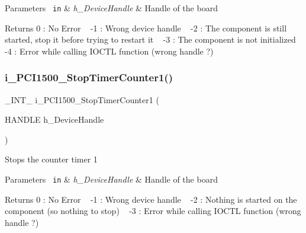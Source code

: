 \begin{DoxyParams}[1]{Parameters}
\mbox{\texttt{ in}}  & {\em h\+\_\+\+Device\+Handle} & Handle of the board\\
\hline
\end{DoxyParams}
\begin{DoxyReturn}{Returns}
0 \+: No Error ~\newline
 -\/1 \+: Wrong device handle ~\newline
 -\/2 \+: The component is still started, stop it before trying to restart it ~\newline
 -\/3 \+: The component is not initialized ~\newline
 -\/4 \+: Error while calling I\+O\+C\+TL function (wrong handle ?) ~\newline

\end{DoxyReturn}
\mbox{\label{group___timer1_ga4e0110031bca63247ff23e9a2419f373}} 
\subsubsection{\texorpdfstring{i\_PCI1500\_StopTimerCounter1()}{i\_PCI1500\_StopTimerCounter1()}}
{\footnotesize\ttfamily \+\_\+\+I\+N\+T\+\_\+ i\+\_\+\+P\+C\+I1500\+\_\+\+Stop\+Timer\+Counter1 (\begin{DoxyParamCaption}\item[{H\+A\+N\+D\+LE}]{h\+\_\+\+Device\+Handle }\end{DoxyParamCaption})}

Stops the counter timer 1


\begin{DoxyParams}[1]{Parameters}
\mbox{\texttt{ in}}  & {\em h\+\_\+\+Device\+Handle} & Handle of the board\\
\hline
\end{DoxyParams}
\begin{DoxyReturn}{Returns}
0 \+: No Error ~\newline
 -\/1 \+: Wrong device handle ~\newline
 -\/2 \+: Nothing is started on the component (so nothing to stop) ~\newline
 -\/3 \+: Error while calling I\+O\+C\+TL function (wrong handle ?) ~\newline

\end{DoxyReturn}
\mbox{\label{group___timer1_gae8b73b20d49abd82694eb9371d7e7c52}} 
